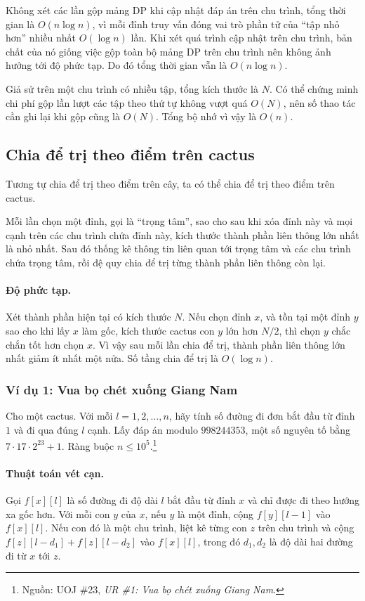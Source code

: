 \documentclass[11pt]{article}
\begin{document}
Không xét các lần gộp mảng DP khi cập nhật đáp án trên chu trình, tổng thời
gian là \(O(n\log n)\), vì mỗi đỉnh truy vấn đóng vai trò phần tử của ``tập
nhỏ hơn'' nhiều nhất \(O(\log n)\) lần. Khi xét quá trình cập nhật trên chu
trình, bản chất của nó giống việc gộp toàn bộ mảng DP trên chu trình nên không
ảnh hưởng tới độ phức tạp. Do đó tổng thời gian vẫn là \(O(n\log n)\).

Giả sử trên một chu trình có nhiều tập, tổng kích thước là \(N\). Có thể chứng
minh chi phí gộp lần lượt các tập theo thứ tự không vượt quá \(O(N)\), nên số
thao tác cần ghi lại khi gộp cũng là \(O(N)\). Tổng bộ nhớ vì vậy là \(O(n)\).

\subsection{Chia để trị theo điểm trên cactus}

Tương tự chia để trị theo điểm trên cây, ta có thể chia để trị theo điểm trên
cactus.

Mỗi lần chọn một đỉnh, gọi là ``trọng tâm'', sao cho sau khi xóa đỉnh này và
mọi cạnh trên các chu trình chứa đỉnh này, kích thước thành phần liên thông lớn
nhất là nhỏ nhất. Sau đó thống kê thông tin liên quan tới trọng tâm và các chu
trình chứa trọng tâm, rồi đệ quy chia để trị từng thành phần liên thông còn
lại.

\paragraph{Độ phức tạp.}
Xét thành phần hiện tại có kích thước \(N\). Nếu chọn đỉnh \(x\), và tồn tại
một đỉnh \(y\) sao cho khi lấy \(x\) làm gốc, kích thước cactus con \(y\) lớn
hơn \(N/2\), thì chọn \(y\) chắc chắn tốt hơn chọn \(x\). Vì vậy sau mỗi lần
chia để trị, thành phần liên thông lớn nhất giảm ít nhất một nửa. Số tầng chia
để trị là \(O(\log n)\).

\subsubsection{Ví dụ 1: Vua bọ chét xuống Giang Nam}

Cho một cactus. Với mỗi \(l=1,2,\ldots,n\), hãy tính số đường đi đơn bắt đầu từ
đỉnh \(1\) và đi qua đúng \(l\) cạnh. Lấy đáp án modulo \(998244353\), một số
nguyên tố bằng \(7\cdot 17\cdot 2^{23}+1\). Ràng buộc
\(n\le 10^5\).\footnote{Nguồn: UOJ \#23, \emph{UR \#1: Vua bọ chét xuống
Giang Nam}.}

\paragraph{Thuật toán vét cạn.}
Gọi \(f[x][l]\) là số đường đi độ dài \(l\) bắt đầu từ đỉnh \(x\) và chỉ được
đi theo hướng xa gốc hơn. Với mỗi con \(y\) của \(x\), nếu \(y\) là một đỉnh,
cộng \(f[y][l-1]\) vào \(f[x][l]\). Nếu con đó là một chu trình, liệt kê từng
con \(z\) trên chu trình và cộng \(f[z][l-d_1]+f[z][l-d_2]\) vào \(f[x][l]\),
trong đó \(d_1,d_2\) là độ dài hai đường đi từ \(x\) tới \(z\).
\end{document}
